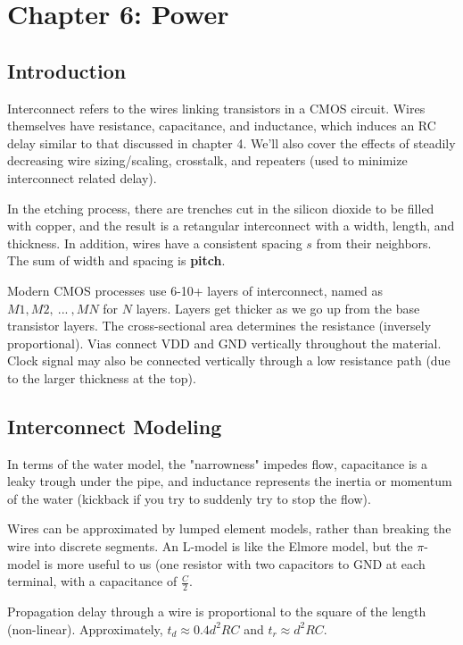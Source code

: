 \documentclass{article}
\begin{document}
\setcounter{section}{5}
\section{Chapter 6: Power} 
\setcounter{subsection}{0}
\subsection{Introduction}
Interconnect refers to the wires linking transistors in a CMOS circuit. Wires themselves have resistance, capacitance, and inductance, which induces an RC delay similar to that discussed in chapter 4. We'll also cover the effects of steadily decreasing wire sizing/scaling, crosstalk, and repeaters (used to minimize interconnect related delay).

In the etching process, there are trenches cut in the silicon dioxide to be filled with copper, and the result is a retangular interconnect with a width, length, and thickness. In addition, wires have a consistent spacing \(s\) from their neighbors. The sum of width and spacing is \textbf{pitch}.

Modern CMOS processes use 6-10+ layers of interconnect, named as \(M1, M2, \ ... \ , MN\) for \(N\) layers. Layers get thicker as we go up from the base transistor layers. The cross-sectional area determines the resistance (inversely proportional). Vias connect VDD and GND vertically throughout the material. Clock signal may also be connected vertically through a low resistance path (due to the larger thickness at the top).

\subsection{Interconnect Modeling}
In terms of the water model, the "narrowness" impedes flow, capacitance is a leaky trough under the pipe, and inductance represents the inertia or momentum of the water (kickback if you try to suddenly try to stop the flow).

Wires can be approximated by lumped element models, rather than breaking the wire into discrete segments. An L-model is like the Elmore model, but the \(\pi\)-model is more useful to us (one resistor with two capacitors to GND at each terminal, with a capacitance of \(\frac{C}{2}\).

Propagation delay through a wire is proportional to the square of the length (non-linear). Approximately, \(t_d \approx 0.4d^2RC\) and \(t_r \approx d^2RC\).
\end{document}
